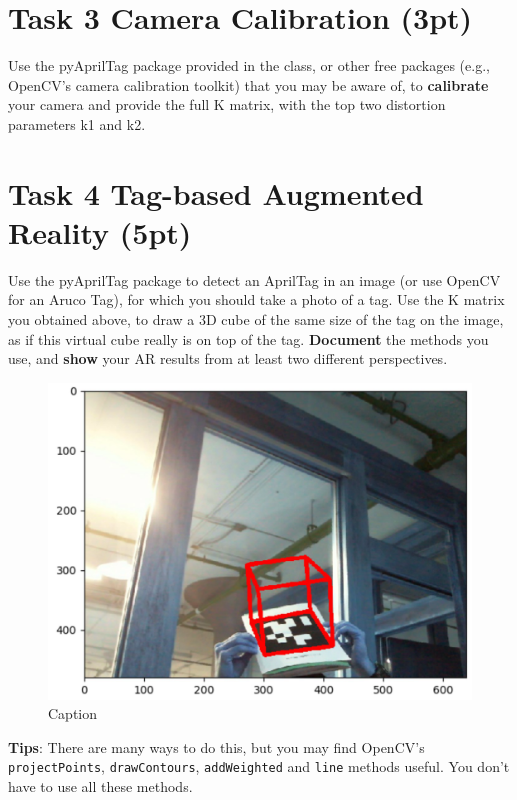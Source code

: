 \documentclass[english]{article}
\begin{document}

\clearpage

\section{Task 3 Camera Calibration (3pt)}

Use the pyAprilTag package provided in the class, or other free packages (e.g., OpenCV’s camera calibration toolkit) that you may be aware of, to \textbf{calibrate} your camera and provide the full K matrix, with the top two distortion parameters k1 and k2.


\clearpage

\section{Task 4 Tag-based Augmented Reality (5pt)}
Use the pyAprilTag package to detect an AprilTag in an image (or use OpenCV for an Aruco Tag), for which you should take a photo of a tag. Use the K matrix you obtained above, to draw a 3D cube of the same size of the tag on the image, as if this virtual cube really is on top of the tag. \textbf{Document} the methods you use, and \textbf{show} your AR results from at least two different perspectives.
\begin{figure}[h]
    \centering
    \includegraphics[scale = 0.2]{figs/ar.png}
    \caption{Caption}
    \label{fig:my_label}
\end{figure}


\textbf{Tips}: There are many ways to do this, but you may find OpenCV's \texttt{projectPoints}, \texttt{drawContours}, \texttt{addWeighted} and \texttt{line} methods useful. You don't have to use all these methods.

\end{document}
